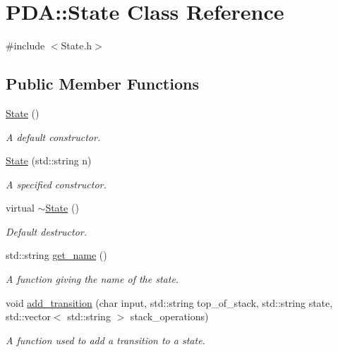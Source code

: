 \hypertarget{classPDA_1_1State}{\section{P\-D\-A\-:\-:State Class Reference}
\label{classPDA_1_1State}
}


{\ttfamily \#include $<$State.\-h$>$}

\subsection*{Public Member Functions}
\begin{DoxyCompactItemize}
\item 
\hyperlink{classPDA_1_1State_a2d91cf0f7a8de4153abf523f70f72c89}{State} ()
\begin{DoxyCompactList}\small\item\em A default constructor. \end{DoxyCompactList}\item 
\hyperlink{classPDA_1_1State_a70be0ec0f495a76b2dd7858885d784a3}{State} (std\-::string n)
\begin{DoxyCompactList}\small\item\em A specified constructor. \end{DoxyCompactList}\item 
virtual \hyperlink{classPDA_1_1State_a2c301a0f1ba94a1780f016fd6fab17d0}{$\sim$\-State} ()
\begin{DoxyCompactList}\small\item\em Default destructor. \end{DoxyCompactList}\item 
std\-::string \hyperlink{classPDA_1_1State_a703a7b3cb61ffc9bd19c4f161c5bb852}{get\-\_\-name} ()
\begin{DoxyCompactList}\small\item\em A function giving the name of the state. \end{DoxyCompactList}\item 
void \hyperlink{classPDA_1_1State_a3d89cda9ad229bebb25ef256e3470ec8}{add\-\_\-transition} (char input, std\-::string top\-\_\-of\-\_\-stack, std\-::string state, std\-::vector$<$ std\-::string $>$ stack\-\_\-operations)
\begin{DoxyCompactList}\small\item\em A function used to add a transition to a state. \end{DoxyCompactList}\item 

\end{DoxyCompactItemize}
